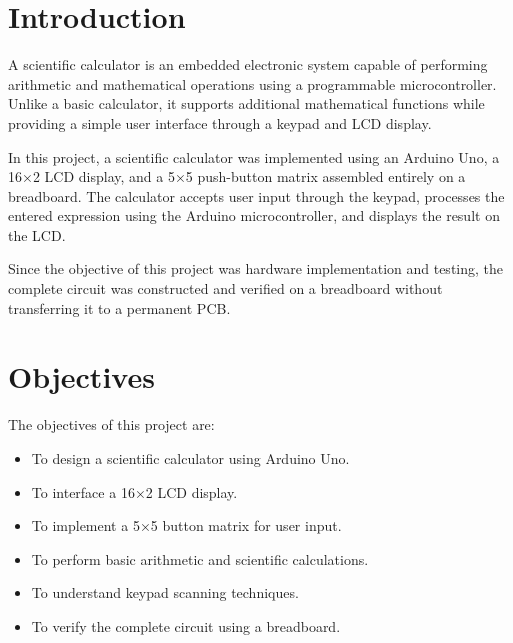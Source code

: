 \documentclass[12pt,a4paper]{article}
\begin{document}
\section{Introduction}

A scientific calculator is an embedded electronic system capable of performing arithmetic and mathematical operations using a programmable microcontroller. Unlike a basic calculator, it supports additional mathematical functions while providing a simple user interface through a keypad and LCD display.

In this project, a scientific calculator was implemented using an Arduino Uno, a 16×2 LCD display, and a 5×5 push-button matrix assembled entirely on a breadboard. The calculator accepts user input through the keypad, processes the entered expression using the Arduino microcontroller, and displays the result on the LCD.

Since the objective of this project was hardware implementation and testing, the complete circuit was constructed and verified on a breadboard without transferring it to a permanent PCB.


\section{Objectives}

The objectives of this project are:

\begin{itemize}

\item To design a scientific calculator using Arduino Uno.

\item To interface a 16×2 LCD display.

\item To implement a 5×5 button matrix for user input.

\item To perform basic arithmetic and scientific calculations.

\item To understand keypad scanning techniques.

\item To verify the complete circuit using a breadboard.

\end{itemize}
\end{document}
